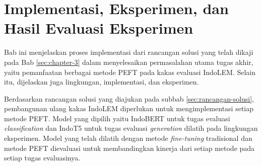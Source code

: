 \chapter{Implementasi, Eksperimen, dan Hasil Evaluasi Eksperimen}
Bab ini menjelaskan proses implementasi dari rancangan solusi yang telah dikaji pada Bab \ref{sec:chapter-3} dalam menyelesaikan permasalahan utama tugas akhir, yaitu pemanfaatan berbagai metode PEFT pada kakas evaluasi IndoLEM. Selain itu, dijelaskan juga lingkungan, implementasi, dan eksperimen.

Berdasarkan rancangan solusi yang diajukan pada subbab \ref{sec:rancangan-solusi}, pembangunan ulang kakas IndoLEM diperlukan untuk mengimplementasi setiap metode PEFT. Model yang dipilih yaitu IndoBERT untuk tugas evaluasi \textit{classification} dan IndoT5 untuk tugas evaluasi \textit{generation} dilatih pada lingkungan eksperimen. Model yang telah dilatih dengan metode \textit{fine-tuning} tradisional dan metode PEFT dievaluasi untuk membandingkan kinerja dari setiap metode pada setiap tugas evaluasinya.






